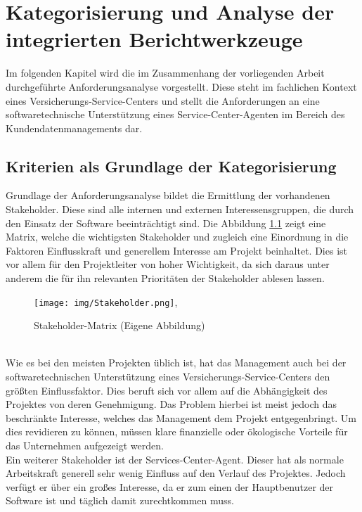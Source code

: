 \chapter{Kategorisierung und Analyse der integrierten Berichtwerkzeuge }
Im folgenden Kapitel wird die im Zusammenhang der vorliegenden Arbeit durchgeführte Anforderungsanalyse vorgestellt. Diese steht im fachlichen Kontext eines Versicherungs-Service-Centers und stellt die Anforderungen an eine softwaretechnische Unterstützung eines Service-Center-Agenten im Bereich des Kundendatenmanagements dar.

\section{Kriterien als Grundlage der Kategorisierung}
Grundlage der Anforderungsanalyse bildet die Ermittlung der vorhandenen Stakeholder. Diese sind alle internen und externen Interessensgruppen, die durch den Einsatz der Software beeinträchtigt sind. 
Die Abbildung \ref{stakeholder} zeigt eine Matrix, welche die wichtigsten Stakeholder und zugleich eine Einordnung in die Faktoren Einflusskraft und generellem Interesse am Projekt beinhaltet.
Dies ist vor allem für den Projektleiter von hoher Wichtigkeit, da sich daraus unter anderem die für ihn relevanten Prioritäten der Stakeholder ablesen lassen.
\\
\begin{figure}[h]
	\begin{center}
		\texttt{[image: img/Stakeholder.png]},
		\caption[Stakeholder-Matrix]
		{Stakeholder-Matrix (Eigene Abbildung)}
		\label{stakeholder}
	\end{center}
\end{figure}
\\
Wie es bei den meisten Projekten üblich ist, hat das Management auch bei der softwaretechnischen Unterstützung eines Versicherungs-Service-Centers den größten Einflussfaktor.  Dies beruft sich vor allem auf die Abhängigkeit des Projektes von deren Genehmigung.  Das Problem hierbei ist meist jedoch das beschränkte Interesse, welches das Management dem Projekt entgegenbringt. Um dies revidieren zu können, müssen klare finanzielle oder ökologische Vorteile für das Unternehmen aufgezeigt werden. \\
Ein weiterer Stakeholder ist der Services-Center-Agent. Dieser hat als normale Arbeitskraft generell sehr wenig Einfluss auf den Verlauf des Projektes. Jedoch verfügt er über ein großes Interesse, da er zum einen der Hauptbenutzer der Software ist und täglich damit zurechtkommen muss. 
